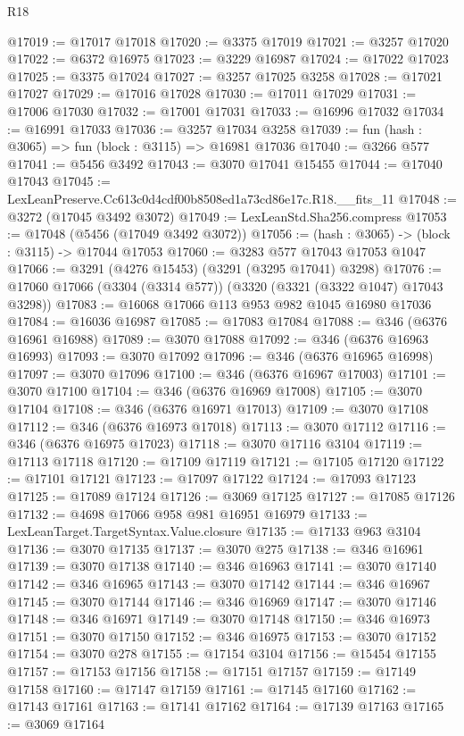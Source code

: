 \begin{lexlean}{R18}
\begin{coremodule}
@17019 := @17017 @17018
@17020 := @3375 @17019
@17021 := @3257 @17020
@17022 := @6372 @16975
@17023 := @3229 @16987
@17024 := @17022 @17023
@17025 := @3375 @17024
@17027 := @3257 @17025 @3258
@17028 := @17021 @17027
@17029 := @17016 @17028
@17030 := @17011 @17029
@17031 := @17006 @17030
@17032 := @17001 @17031
@17033 := @16996 @17032
@17034 := @16991 @17033
@17036 := @3257 @17034 @3258
@17039 := fun (hash : @3065) => fun (block : @3115) => @16981 @17036
@17040 := @3266 @577
@17041 := @5456 @3492
@17043 := @3070 @17041 @15455
@17044 := @17040 @17043
@17045 := LexLeanPreserve.Cc613c0d4cdf00b8508ed1a73cd86e17c.R18.__fits_11
@17048 := @3272 (@17045 @3492 @3072)
@17049 := LexLeanStd.Sha256.compress
@17053 := @17048 (@5456 (@17049 @3492 @3072))
@17056 := (hash : @3065) -> (block : @3115) -> @17044 @17053
@17060 := @3283 @577 @17043 @17053 @1047
@17066 := @3291 (@4276 @15453) (@3291 (@3295 @17041) @3298)
@17076 := @17060 @17066 (@3304 (@3314 @577)) (@3320 (@3321 (@3322 @1047) @17043 @3298))
@17083 := @16068 @17066 @113 @953 @982 @1045 @16980 @17036
@17084 := @16036 @16987
@17085 := @17083 @17084
@17088 := @346 (@6376 @16961 @16988)
@17089 := @3070 @17088
@17092 := @346 (@6376 @16963 @16993)
@17093 := @3070 @17092
@17096 := @346 (@6376 @16965 @16998)
@17097 := @3070 @17096
@17100 := @346 (@6376 @16967 @17003)
@17101 := @3070 @17100
@17104 := @346 (@6376 @16969 @17008)
@17105 := @3070 @17104
@17108 := @346 (@6376 @16971 @17013)
@17109 := @3070 @17108
@17112 := @346 (@6376 @16973 @17018)
@17113 := @3070 @17112
@17116 := @346 (@6376 @16975 @17023)
@17118 := @3070 @17116 @3104
@17119 := @17113 @17118
@17120 := @17109 @17119
@17121 := @17105 @17120
@17122 := @17101 @17121
@17123 := @17097 @17122
@17124 := @17093 @17123
@17125 := @17089 @17124
@17126 := @3069 @17125
@17127 := @17085 @17126
@17132 := @4698 @17066 @958 @981 @16951 @16979
@17133 := LexLeanTarget.TargetSyntax.Value.closure
@17135 := @17133 @963 @3104
@17136 := @3070 @17135
@17137 := @3070 @275
@17138 := @346 @16961
@17139 := @3070 @17138
@17140 := @346 @16963
@17141 := @3070 @17140
@17142 := @346 @16965
@17143 := @3070 @17142
@17144 := @346 @16967
@17145 := @3070 @17144
@17146 := @346 @16969
@17147 := @3070 @17146
@17148 := @346 @16971
@17149 := @3070 @17148
@17150 := @346 @16973
@17151 := @3070 @17150
@17152 := @346 @16975
@17153 := @3070 @17152
@17154 := @3070 @278
@17155 := @17154 @3104
@17156 := @15454 @17155
@17157 := @17153 @17156
@17158 := @17151 @17157
@17159 := @17149 @17158
@17160 := @17147 @17159
@17161 := @17145 @17160
@17162 := @17143 @17161
@17163 := @17141 @17162
@17164 := @17139 @17163
@17165 := @3069 @17164

\end{coremodule}
\end{lexlean}

